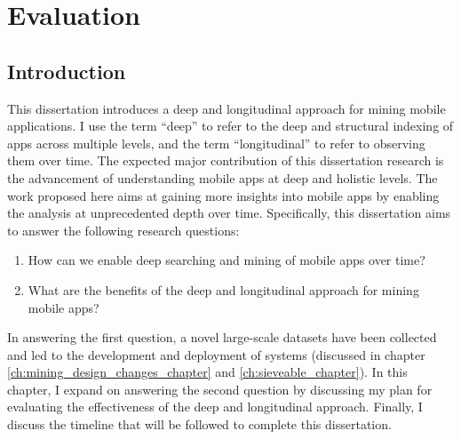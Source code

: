 \chapter{Evaluation}
\label{ch:evaluation}

\section{Introduction}
This dissertation introduces a deep and longitudinal approach for mining mobile applications.
I use the term ``deep'' to refer to the deep and structural indexing of apps across multiple levels, and the term ``longitudinal'' to refer to observing them over time.
The expected major contribution of this dissertation research is the advancement of understanding mobile apps at deep and holistic levels.
The work proposed here aims at gaining more insights into mobile apps by enabling the analysis at unprecedented depth over time.
Specifically, this dissertation aims to answer the following research questions:
\begin{enumerate}
	\item How can we enable deep searching and mining of mobile apps over time?
	\item What are the benefits of the deep and longitudinal approach for mining mobile apps?
\end{enumerate}

In answering the first question, a novel large-scale datasets have been collected and led to the development and deployment of systems (discussed in chapter \ref{ch:mining_design_changes_chapter} and \ref{ch:sieveable_chapter}).
In this chapter, I expand on answering the second question by discussing my plan for evaluating the effectiveness of the deep and longitudinal approach.
Finally, I discuss the timeline that will be followed to complete this dissertation.

